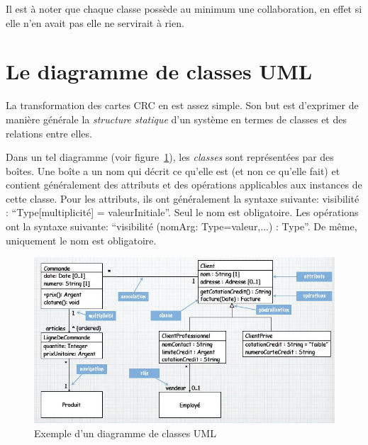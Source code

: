 Il est à noter que chaque classe possède au minimum une collaboration,
en effet si elle n'en avait pas elle ne servirait à rien.

\section{Le diagramme de classes UML}
La transformation des cartes CRC en
 est assez simple.
Son but est d'exprimer de manière générale la \emph{structure statique}
d'un système en termes de classes et des relations entre elles.

Dans un tel diagramme (voir figure~\ref{diagramme_classes}),
les \emph{classes} sont représentées par des boîtes.
Une boîte a un nom qui décrit ce qu'elle est (et non ce qu'elle fait)
et contient généralement des attributs et des opérations applicables
aux instances de cette classe.
Pour les attributs,
ils ont généralement la syntaxe suivante:
visibilité  : ``Type[multiplicité] = valeurInitiale''.
Seul le nom est obligatoire.
Les opérations ont la syntaxe suivante:
``visibilité (nomArg: Type=valeur,...) : Type''.
De même, uniquement le nom est obligatoire.

\begin{figure}[h]
  \centering
  \includegraphics[scale=0.8]{diagramme_classes.jpg}
  \caption{Exemple d'un diagramme de classes UML}
  \label{diagramme_classes}
\end{figure}

